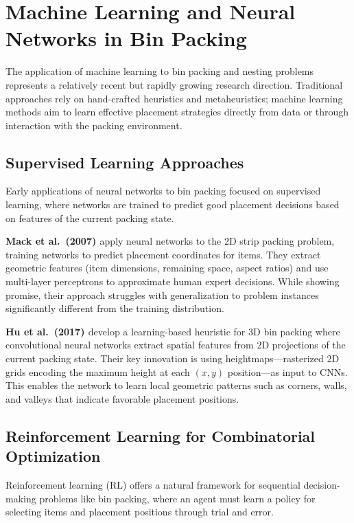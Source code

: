 \section{Machine Learning and Neural Networks in Bin Packing}
\label{sec:ml-bin-packing}

The application of machine learning to bin packing and nesting problems represents a relatively recent but rapidly growing research direction. Traditional approaches rely on hand-crafted heuristics and metaheuristics; machine learning methods aim to learn effective placement strategies directly from data or through interaction with the packing environment.

\subsection{Supervised Learning Approaches}

Early applications of neural networks to bin packing focused on supervised learning, where networks are trained to predict good placement decisions based on features of the current packing state.

\textbf{Mack et al.\ (2007) \cite{MBK07}} apply neural networks to the 2D strip packing problem, training networks to predict placement coordinates for items. They extract geometric features (item dimensions, remaining space, aspect ratios) and use multi-layer perceptrons to approximate human expert decisions. While showing promise, their approach struggles with generalization to problem instances significantly different from the training distribution.

\textbf{Hu et al.\ (2017) \cite{HLZ17}} develop a learning-based heuristic for 3D bin packing where convolutional neural networks extract spatial features from 2D projections of the current packing state. Their key innovation is using heightmaps---rasterized 2D grids encoding the maximum height at each $(x,y)$ position---as input to CNNs. This enables the network to learn local geometric patterns such as corners, walls, and valleys that indicate favorable placement positions.

\subsection{Reinforcement Learning for Combinatorial Optimization}

Reinforcement learning (RL) offers a natural framework for sequential decision-making problems like bin packing, where an agent must learn a policy for selecting items and placement positions through trial and error.


